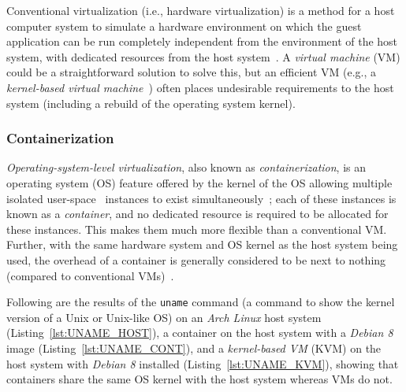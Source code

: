\medskip

Conventional virtualization (i.e., hardware virtualization) is a method for a
host computer system to simulate a hardware environment on which the guest
application can be run completely independent from the environment of the host
system, with dedicated resources from the host system~\citep[Chapter 16]{os}.
A \emph{virtual machine} (VM) could be a straightforward solution to solve
this,
but an efficient VM
(e.g., a \emph{kernel-based virtual machine}~\cite{kvm}) 
often places undesirable requirements to the host system 
(including a rebuild of the operating system kernel).

\subsubsection{Containerization}
\emph{Operating-system-level virtualization}, also known as
\emph{containerization}, is an operating system (OS) feature offered by the
kernel of the OS allowing multiple isolated user-space~\citep[Section 1.5.1]{os}
instances to exist simultaneously~\cite{docker};
each of these instances is known as a \emph{container}, and no dedicated resource
is required to be allocated for these instances.
This makes them much more
flexible than a conventional VM.
Further, with the same hardware system and
OS kernel as the host system being used, the overhead of a container is
generally considered to be next to nothing (compared to conventional VMs)~\cite{dockerVM}.

\pagebreak

Following are the results of the \texttt{uname} command
(a command to show the kernel version of a Unix or Unix-like OS)
on an \emph{Arch Linux} host system (Listing~\ref{lst:UNAME_HOST}),
a container on the host system with a \emph{Debian 8}~\cite{debian} image
(Listing~\ref{lst:UNAME_CONT}),
and a \emph{kernel-based VM} (KVM) on the host system with \emph{Debian 8} installed
(Listing~\ref{lst:UNAME_KVM}),
showing that containers share the same OS kernel with the host system whereas
VMs do not.


\begin{centering}



\end{centering}

